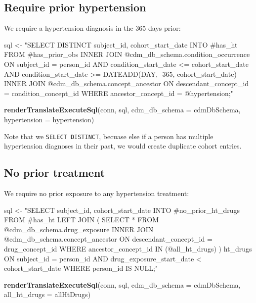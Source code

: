 \documentclass[11pt]{book}
\newenvironment{Shaded}{\begin{snugshade}}{\end{snugshade}}
\newcommand{\DataTypeTok}[1]{\textcolor[rgb]{0.13,0.29,0.53}{#1}}
\newcommand{\KeywordTok}[1]{\textcolor[rgb]{0.13,0.29,0.53}{\textbf{#1}}}
\newcommand{\NormalTok}[1]{#1}
\newcommand{\StringTok}[1]{\textcolor[rgb]{0.31,0.60,0.02}{#1}}
\theoremstyle{definition}
\theoremstyle{definition}
\theoremstyle{definition}
\theoremstyle{remark}
\begin{document}
\hypertarget{require-prior-hypertension}{%
\subsection{Require prior hypertension}\label{require-prior-hypertension}}

We require a hypertension diagnosis in the 365 days prior:

\begin{Shaded}
\begin{Highlighting}[]
\NormalTok{sql <-}\StringTok{ "SELECT DISTINCT subject_id,}
\StringTok{  cohort_start_date}
\StringTok{INTO #has_ht}
\StringTok{FROM #has_prior_obs}
\StringTok{INNER JOIN @cdm_db_schema.condition_occurrence}
\StringTok{  ON subject_id = person_id}
\StringTok{    AND condition_start_date <= cohort_start_date}
\StringTok{    AND condition_start_date >= DATEADD(DAY, -365, cohort_start_date)}
\StringTok{INNER JOIN @cdm_db_schema.concept_ancestor}
\StringTok{  ON descendant_concept_id = condition_concept_id}
\StringTok{WHERE ancestor_concept_id = @hypertension;"}

\KeywordTok{renderTranslateExecuteSql}\NormalTok{(conn, sql, }\DataTypeTok{cdm_db_schema =}\NormalTok{ cdmDbSchema, }\DataTypeTok{hypertension =}\NormalTok{ hypertension)}
\end{Highlighting}
\end{Shaded}

Note that we \texttt{SELECT\ DISTINCT}, becuase else if a person has multiple hypertension diagnoses in their past, we would create duplicate cohort entries.

\hypertarget{no-prior-treatment}{%
\subsection{No prior treatment}\label{no-prior-treatment}}

We require no prior exposure to any hypertension treatment:

\begin{Shaded}
\begin{Highlighting}[]
\NormalTok{sql <-}\StringTok{ "SELECT subject_id,}
\StringTok{  cohort_start_date}
\StringTok{INTO #no_prior_ht_drugs}
\StringTok{FROM #has_ht}
\StringTok{LEFT JOIN (}
\StringTok{  SELECT *}
\StringTok{  FROM @cdm_db_schema.drug_exposure}
\StringTok{  INNER JOIN @cdm_db_schema.concept_ancestor}
\StringTok{    ON descendant_concept_id = drug_concept_id}
\StringTok{  WHERE ancestor_concept_id IN (@all_ht_drugs)}
\StringTok{) ht_drugs}
\StringTok{  ON subject_id = person_id}
\StringTok{    AND drug_exposure_start_date < cohort_start_date}
\StringTok{WHERE person_id IS NULL;"}

\KeywordTok{renderTranslateExecuteSql}\NormalTok{(conn, sql, }\DataTypeTok{cdm_db_schema =}\NormalTok{ cdmDbSchema, }\DataTypeTok{all_ht_drugs =}\NormalTok{ allHtDrugs)}
\end{Highlighting}
\end{Shaded}
\end{document}
